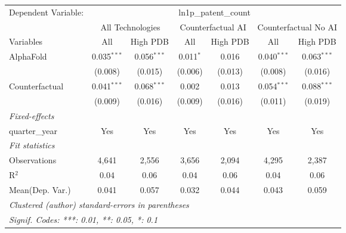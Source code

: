 \begingroup
\centering
\begin{tabular}{lcccccc}
   \tabularnewline \midrule \midrule
   Dependent Variable: & \multicolumn{6}{c}{ln1p\_patent\_count}\\
 & \multicolumn{2}{c}{All Technologies} & \multicolumn{2}{c}{Counterfactual AI} & \multicolumn{2}{c}{Counterfactual No AI} \\
\cmidrule(lr){1-1}\cmidrule(lr){2-3} \cmidrule(lr){4-5} \cmidrule(lr){6-7}
Variables & \multicolumn{1}{c}{All} & \multicolumn{1}{c}{High PDB} & \multicolumn{1}{c}{All} & \multicolumn{1}{c}{High PDB} & \multicolumn{1}{c}{All} & \multicolumn{1}{c}{High PDB} \\
\cmidrule(lr){1-1}\cmidrule(lr){2-2} \cmidrule(lr){3-3} \cmidrule(lr){4-4} \cmidrule(lr){5-5} \cmidrule(lr){6-6} \cmidrule(lr){7-7}
   AlphaFold      & 0.035$^{***}$ & 0.056$^{***}$ & 0.011$^{*}$ & 0.016   & 0.040$^{***}$ & 0.063$^{***}$\\   
                  & (0.008)       & (0.015)       & (0.006)     & (0.013) & (0.008)       & (0.016)\\   
   Counterfactual & 0.041$^{***}$ & 0.068$^{***}$ & 0.002       & 0.013   & 0.054$^{***}$ & 0.088$^{***}$\\   
                  & (0.009)       & (0.016)       & (0.009)     & (0.016) & (0.011)       & (0.019)\\   
   \midrule
   \emph{Fixed-effects}\\
   quarter\_year  & Yes           & Yes           & Yes         & Yes     & Yes           & Yes\\  
   \midrule
   \emph{Fit statistics}\\
   Observations   & 4,641         & 2,556         & 3,656       & 2,094   & 4,295         & 2,387\\  
   R$^2$          & 0.04          & 0.06          & 0.04        & 0.06    & 0.04          & 0.06\\  
Mean(Dep. Var.) & 0.041 & 0.057 & 0.032 & 0.044 & 0.043 & 0.059 \\
   \midrule \midrule
   \multicolumn{7}{l}{\emph{Clustered (author) standard-errors in parentheses}}\\
   \multicolumn{7}{l}{\emph{Signif. Codes: ***: 0.01, **: 0.05, *: 0.1}}\\
\end{tabular}
\par\endgroup
